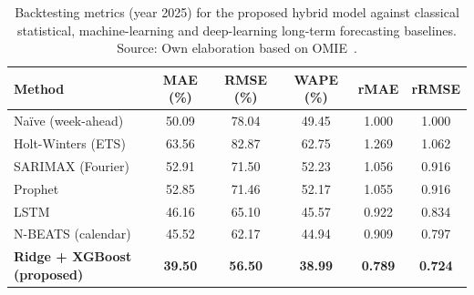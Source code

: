 \begin{table}[H]
    \centering
    \caption{Backtesting metrics (year 2025) for the proposed hybrid model against classical statistical, machine-learning and deep-learning long-term forecasting baselines. Source: Own elaboration based on OMIE~\cite{omie2025}.}
    \label{tab:method_comparison}
    \begin{tabular}{lccccc}
        \toprule
        \textbf{Method} & \textbf{MAE (\%)} & \textbf{RMSE (\%)} & \textbf{WAPE (\%)} & \textbf{rMAE} & \textbf{rRMSE} \\
        \midrule
        Naïve (week-ahead) & 50.09 & 78.04 & 49.45 & 1.000 & 1.000 \\
        Holt-Winters (ETS) & 63.56 & 82.87 & 62.75 & 1.269 & 1.062 \\
        SARIMAX (Fourier) & 52.91 & 71.50 & 52.23 & 1.056 & 0.916 \\
        Prophet & 52.85 & 71.46 & 52.17 & 1.055 & 0.916 \\
        LSTM & 46.16 & 65.10 & 45.57 & 0.922 & 0.834 \\
        N-BEATS (calendar) & 45.52 & 62.17 & 44.94 & 0.909 & 0.797 \\
        \textbf{Ridge + XGBoost (proposed)} & \textbf{39.50} & \textbf{56.50} & \textbf{38.99} & \textbf{0.789} & \textbf{0.724} \\
        \bottomrule
    \end{tabular}
\end{table}